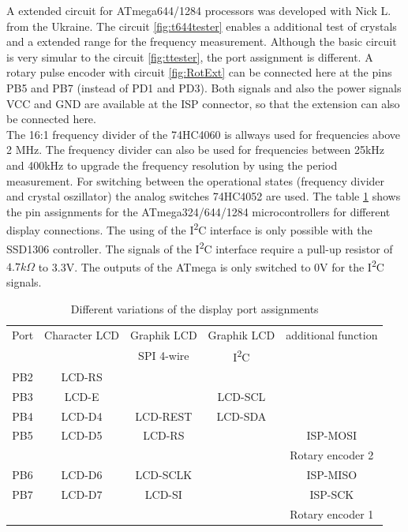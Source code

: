 A extended circuit for ATmega644/1284 processors was developed with Nick L. from the Ukraine.
The circuit \ref{fig:t644tester} enables a additional test of crystals and a extended range
for the frequency measurement.
Although the basic circuit is very simular to the circuit \ref{fig:ttester}, the
port assignment is different.
A rotary pulse encoder with circuit \ref{fig:RotExt} can be connected here at the pins PB5 and PB7 (instead of PD1 and PD3).
Both signals and also the power signals VCC and GND are available at the ISP connector,
so that the extension can also be connected here.\\

The 16:1 frequency divider of the 74HC4060 is allways used for frequencies above 2 MHz.
The frequency divider can also be used for frequencies between 25kHz and 400kHz to
upgrade the frequency resolution by using the period measurement.
For switching between the operational states (frequency divider and crystal oszillator)
the analog switches 74HC4052 are used.
The table \ref{tab:mega644-display} shows the pin assignments for the ATmega324/644/1284
microcontrollers for different display connections.
The using of the I\textsuperscript{2}C interface is only possible with the SSD1306 controller.
The signals of the I\textsuperscript{2}C interface require a pull-up resistor of \(4.7k\Omega\) to 3.3V.
The outputs of the ATmega is only switched to 0V for the I\textsuperscript{2}C signals.


\begin{table}[H]
  \begin{center}
    \begin{tabular}{| c || c | c | c | c |}
    \hline
      Port & Character LCD &  Graphik LCD  & Graphik LCD  & additional function\\
           &               &  SPI 4-wire   &   I\textsuperscript{2}C        &            \\
    \hline
    \hline
    PB2    &  LCD-RS         &            &             &       \\
    \hline
    PB3    &  LCD-E          &            &  LCD-SCL    &       \\
    \hline
    PB4    &  LCD-D4         &  LCD-REST  &  LCD-SDA    &       \\
    \hline
    PB5    &  LCD-D5         &  LCD-RS    &             & ISP-MOSI \\
           &                 &            &             & Rotary encoder 2 \\
    \hline
    PB6    &  LCD-D6         &  LCD-SCLK  &             & ISP-MISO \\
    \hline
    PB7    &  LCD-D7         &  LCD-SI    &             & ISP-SCK  \\
           &                 &            &             & Rotary encoder 1 \\
    \hline
    \end{tabular}
  \end{center}
  \caption{Different variations of the display port assignments}
  \label{tab:mega644-display}
\end{table}

